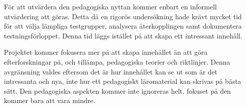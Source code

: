 För att utvärdera den pedagogiska nyttan kommer enbart en informell utvärdering
att göras. Detta då en rigorös undersökning hade krävt mycket tid för att välja
lämpliga testgrupper, analysera återkopplingen samt dokumentera
testningsförloppet. Denna tid läggs istället på att skapa ett intressant innehåll.

Projektet kommer fokusera mer på att skapa innehållet än att göra
efterforskningar på, och tillämpa, pedagogiska teorier och riktlinjer. Denna
avgränsning valdes eftersom det är hur innehållet kan se ut som är det
intressanta och nya, inte hur ett pedagogiskt läromaterial kan skrivas på bästa sätt. Den
pedagogiska aspekten kommer inte ignoreras helt, fokuset på den kommer bara att
vara mindre.
